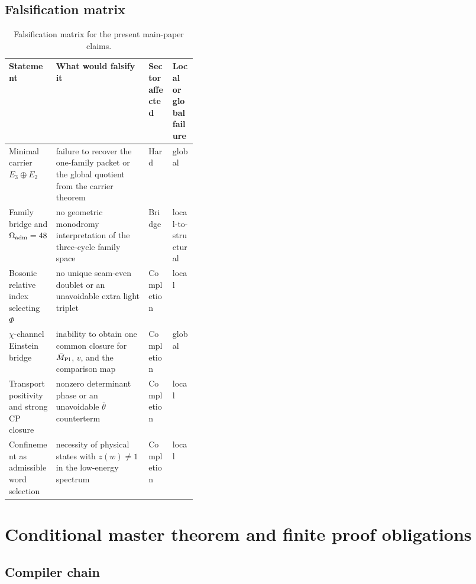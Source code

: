 \subsection{Falsification matrix}

\begin{table}[t]
\centering
\small
\begin{tabularx}{\linewidth}{@{}>{\raggedright\arraybackslash}p{0.24\linewidth}YY>{\raggedright\arraybackslash}p{0.13\linewidth}@{}}
\toprule
Statement & What would falsify it & Sector affected & Local or global failure \\
\midrule
Minimal carrier $E_3\oplus E_2$ & failure to recover the one-family packet or the global quotient from the carrier theorem & Hard & global \\
Family bridge and $\Omega_{\mathrm{adm}}=48$ & no geometric monodromy interpretation of the three-cycle family space & Bridge & local-to-structural \\
Bosonic relative index selecting $\Phi$ & no unique seam-even doublet or an unavoidable extra light triplet & Completion & local \\
$\chi$-channel Einstein bridge & inability to obtain one common closure for $\bar M_{\mathrm{Pl}}$, $v$, and the comparison map & Completion & global \\
Transport positivity and strong CP closure & nonzero determinant phase or an unavoidable $\bar\theta$ counterterm & Completion & local \\
Confinement as admissible word selection & necessity of physical states with $z(w)\neq1$ in the low-energy spectrum & Completion & local \\
\bottomrule
\end{tabularx}
\caption{Falsification matrix for the present main-paper claims.}
\label{tab:falsification}
\end{table}

\section{Conditional master theorem and finite proof obligations}

\subsection{Compiler chain}

